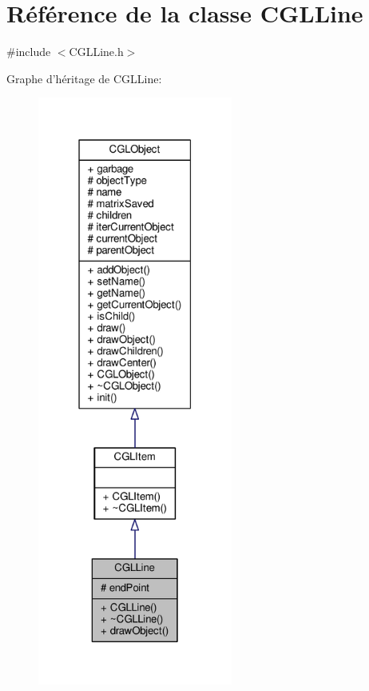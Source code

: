 \hypertarget{class_c_g_l_line}{\section{Référence de la classe C\-G\-L\-Line}
\label{class_c_g_l_line}
}


{\ttfamily \#include $<$C\-G\-L\-Line.\-h$>$}



Graphe d'héritage de C\-G\-L\-Line\-:\nopagebreak
\begin{figure}[H]
\begin{center}
\leavevmode
\includegraphics[height=550pt]{d9/dd7/class_c_g_l_line__inherit__graph}
\end{center}
\end{figure}


